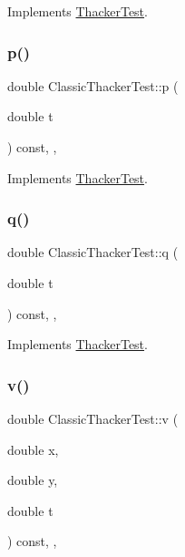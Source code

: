 Implements \hyperlink{classThackerTest_a4cdc886e1127e7f160cae4ed8e49f2d7}{Thacker\+Test}.

\mbox{\label{classClassicThackerTest_a485cf3ccda6e8573c83b5e9dca726c13}} 
\subsubsection{\texorpdfstring{p()}{p()}}
{\footnotesize\ttfamily double Classic\+Thacker\+Test\+::p (\begin{DoxyParamCaption}\item[{double}]{t }\end{DoxyParamCaption}) const\hspace{0.3cm}{\ttfamily [inline]}, {\ttfamily [override]}, {\ttfamily [virtual]}}



Implements \hyperlink{classThackerTest_a9174c2c16088c48c1ece4356289e4a6c}{Thacker\+Test}.

\mbox{\label{classClassicThackerTest_a732011d2dec24e6c747282391a72ccbf}} 
\subsubsection{\texorpdfstring{q()}{q()}}
{\footnotesize\ttfamily double Classic\+Thacker\+Test\+::q (\begin{DoxyParamCaption}\item[{double}]{t }\end{DoxyParamCaption}) const\hspace{0.3cm}{\ttfamily [inline]}, {\ttfamily [override]}, {\ttfamily [virtual]}}



Implements \hyperlink{classThackerTest_a622e4cd3846a7e6ea906111b6be6a0b7}{Thacker\+Test}.

\mbox{\label{classClassicThackerTest_a7dcad970cbd5afaec513109e701075e8}} 
\subsubsection{\texorpdfstring{v()}{v()}}
{\footnotesize\ttfamily double Classic\+Thacker\+Test\+::v (\begin{DoxyParamCaption}\item[{double}]{x,  }\item[{double}]{y,  }\item[{double}]{t }\end{DoxyParamCaption}) const\hspace{0.3cm}{\ttfamily [inline]}, {\ttfamily [override]}, {\ttfamily [virtual]}}



